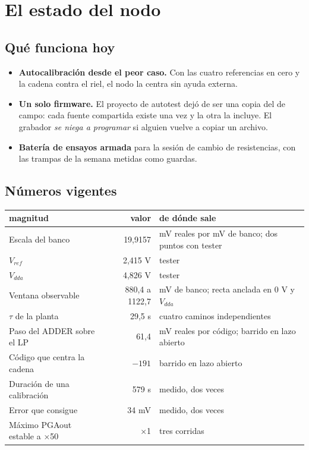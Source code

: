 \documentclass[11pt,a4paper]{article}
\begin{document}
\section{El estado del nodo}

\subsection{Qué funciona hoy}

\begin{itemize}
  \item \textbf{Autocalibración desde el peor caso.} Con las cuatro referencias
        en cero y la cadena contra el riel, el nodo la centra sin ayuda externa.
  \item \textbf{Un solo firmware.} El proyecto de autotest dejó de ser una copia
        del de campo: cada fuente compartida existe una vez y la otra la incluye.
        El grabador \emph{se niega a programar} si alguien vuelve a copiar un
        archivo.
  \item \textbf{Batería de ensayos armada} para la sesión de cambio de
        resistencias, con las trampas de la semana metidas como guardas.
\end{itemize}

\subsection{Números vigentes}

\begin{center}
\begin{tabular}{l r p{4.6cm}}
\toprule
\textbf{magnitud} & \textbf{valor} & \textbf{de dónde sale} \\
\midrule
Escala del banco            & 19,9157 & mV reales por mV de banco; dos puntos con tester \\
$V_{ref}$                   & 2,415 V                            & tester \\
$V_{dda}$                   & 4,826 V                            & tester \\
Ventana observable          & 880,4 a 1122,7 & mV de banco; recta anclada en 0 V y $V_{dda}$ \\
$\tau$ de la planta         & 29,5 s                             & cuatro caminos independientes \\
Paso del ADDER sobre el LP  & 61,4 & mV reales por código; barrido en lazo abierto \\
Código que centra la cadena & $-191$                             & barrido en lazo abierto \\
Duración de una calibración & 579 s                              & medido, dos veces \\
Error que consigue          & 34 mV                              & medido, dos veces \\
Máximo PGAout estable a ×50 & ×1                                 & tres corridas \\
\bottomrule
\end{tabular}
\end{center}
\end{document}
